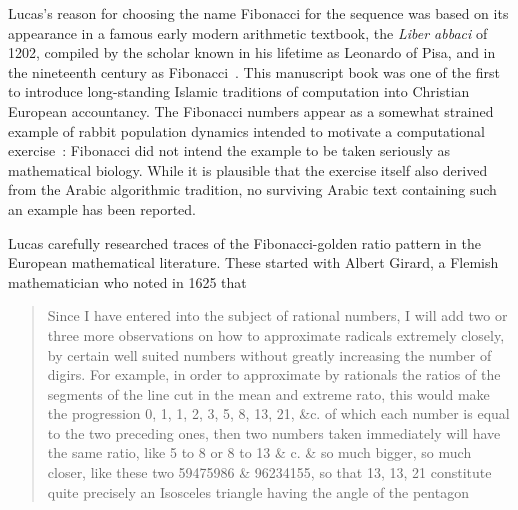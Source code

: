 \documentclass{memoir}
\begin{document}
Lucas's reason for choosing the name Fibonacci for the sequence was based on its appearance in a famous early modern arithmetic textbook, the \textit{Liber abbaci} of 1202, compiled by the scholar known in his lifetime as Leonardo of Pisa, and in the nineteenth century as Fibonacci~\cite{siglerFibonaccisLiberAbaci2002}. This manuscript book was one of the first to introduce long-standing Islamic traditions of computation into Christian European accountancy.  The Fibonacci numbers appear as a somewhat strained example of rabbit population dynamics intended to motivate a computational exercise~\cite{hoyrupFibonacciProtagonistWitness2014}: Fibonacci did not intend the example to be taken seriously as mathematical biology.  While it is plausible that the exercise itself also derived from the Arabic algorithmic tradition, no surviving Arabic text containing such an example has been reported.

Lucas carefully researched  traces of the Fibonacci-golden ratio pattern in the European mathematical literature. These started with Albert Girard, a Flemish mathematician who noted in 1625 that 
\begin{quotation}
	Since I have entered into the subject of rational numbers, I will add two or three more observations on how  to approximate radicals extremely closely, by certain well suited numbers without greatly increasing the number of digirs. For example, in order to approximate by rationals the ratios of the segments of the line cut in the mean and extreme rato, this would make the progression 0, 1, 1, 2, 3, 5, 8, 13, 21, &c. of which each number is equal to the two preceding ones, then two numbers taken immediately will have the same ratio,  like 5 to 8 or 8 to 13 & c. & so much bigger, so much closer, like these two 59475986 & 96234155, so that 13, 13, 21 constitute quite precisely an Isosceles triangle having the angle of the pentagon%
	\end{quotation}
\printbibliography
\end{document}
